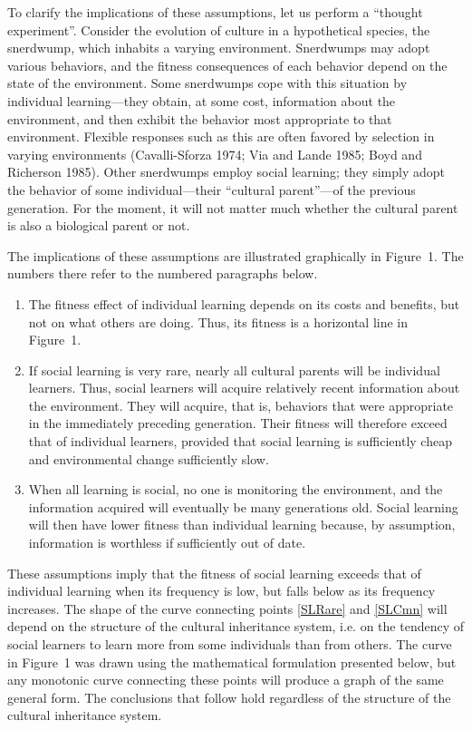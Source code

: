 \documentclass[11pt]{article}
\begin{document}
To clarify the implications of these assumptions, let us perform a
``thought experiment''.  Consider the evolution of culture in a
hypothetical species, the snerdwump, which inhabits a varying
environment.  Snerdwumps may adopt various behaviors, and the fitness
consequences of each behavior depend on the state of the environment. 
Some snerdwumps cope with this situation by individual learning---they
obtain, at some cost, information about the environment, and then exhibit
the behavior most appropriate to that environment.  Flexible responses
such as this are often favored by selection in varying environments
(Cavalli-Sforza 1974; Via and Lande 1985; Boyd and Richerson 1985).  Other
snerdwumps employ social learning; they simply adopt the behavior of some
individual---their ``cultural parent''---of the previous generation.  For
the moment, it will not matter much whether the cultural parent is also a
biological parent or not.

The implications of these assumptions are illustrated graphically in
Figure~1.  The numbers there refer to the numbered paragraphs below.
\begin{enumerate}
\item
The fitness effect of individual learning depends on its costs and
benefits, but not on what others are doing.  Thus, its fitness is a
horizontal line in Figure~1.  
\item \label{SLRare}
If social learning is very rare, nearly all cultural parents will be
individual learners.  Thus, social learners will acquire relatively recent
information about the environment.  They will acquire, that is, behaviors
that were appropriate in the immediately preceding generation.  Their
fitness will therefore exceed that of individual learners,
provided that social learning is sufficiently cheap and environmental
change sufficiently slow.
\item \label{SLCmn}
When all learning is social, no one is monitoring the environment, and
the information acquired will eventually be many generations old.
Social learning will then have lower fitness than individual learning
because, by assumption, information is worthless if sufficiently out of
date.
\end{enumerate}

These assumptions imply that the fitness of social learning exceeds that
of individual learning when its frequency is low, but falls below as its
frequency increases.  The shape of the curve connecting points
\ref{SLRare} and \ref{SLCmn}
will depend on the structure of the cultural inheritance system, i.e. on
the tendency of social learners to learn more from some individuals than
from others. The curve in Figure~1 was drawn using the mathematical
formulation presented below, but any monotonic curve connecting these
points will produce a graph of the same general form.  The conclusions
that follow hold regardless of the structure of the cultural inheritance
system.
\end{document}
